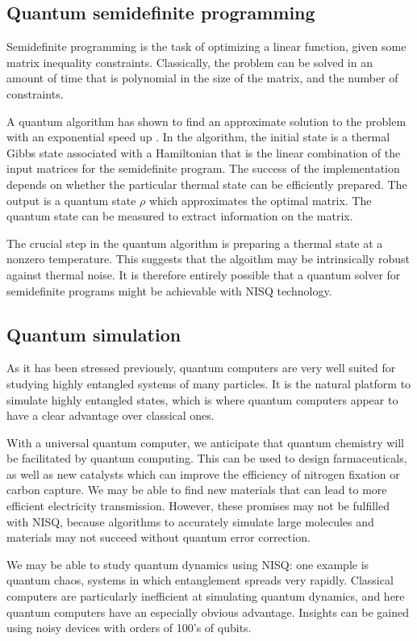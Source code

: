 \subsection{Quantum semidefinite programming}

Semidefinite programming is the task of optimizing a linear function, given some matrix inequality constraints. Classically, the problem can be solved in an amount of time that 
is polynomial in the size of the matrix, and the number of constraints.

A quantum algorithm has shown to find an approximate solution to the problem with an exponential speed up \cite{}. In the algorithm, the initial state is a thermal Gibbs state associated with a Hamiltonian that is the linear combination of the input matrices for the semidefinite program. The success of the implementation depends on whether the particular thermal state can be efficiently prepared. 
The output is a quantum state $\rho$ which approximates the optimal matrix. The quantum state can be measured to extract information on the matrix. 


The crucial step in the quantum algorithm is preparing a thermal state at a nonzero temperature. This suggests that the algoithm may be intrinsically robust against thermal noise. It is therefore entirely possible that a quantum solver for semidefinite programs might be achievable with NISQ technology.


\subsection{Quantum simulation}
As it has been stressed previously, quantum computers are very well suited for studying highly entangled systems of many particles. It is the natural platform to simulate highly entangled states, which is where quantum computers appear to have a clear advantage over classical ones.
 
With a universal quantum computer, we anticipate that quantum chemistry will be facilitated by quantum computing. This can be used to design farmaceuticals, as well as new catalysts which can improve the efficiency of nitrogen fixation or carbon capture. We may be able to find new materials that can lead to more efficient electricity transmission. However, these promises may not be fulfilled with NISQ, because algorithms to accurately simulate large molecules and materials may not succeed without quantum error correction.

We may be able to study quantum dynamics using NISQ: one example is quantum chaos, systems in which entanglement spreads very rapidly. Classical computers are particularly inefficient at simulating quantum dynamics, and here quantum computers have an especially obvious advantage. Insights can be gained using noisy devices with orders of 100's of qubits.

